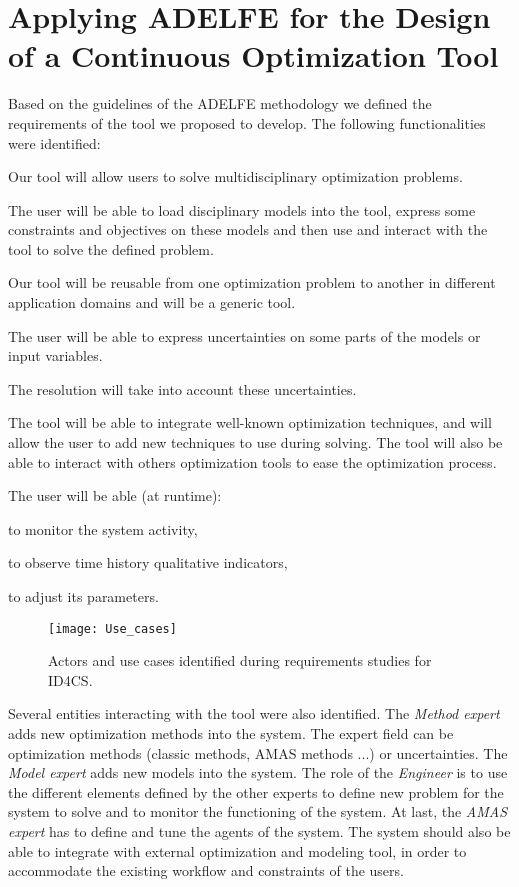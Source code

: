 \section{Applying ADELFE for the Design of a Continuous Optimization Tool}

Based on the guidelines of the ADELFE methodology we defined the requirements of the tool we proposed to develop. The following functionalities were identified:
\begin{compactitem}
\item Our tool will allow users to solve multidisciplinary optimization problems.
\item The user will be able to load disciplinary models into the tool, express some constraints and objectives on these models and then use and interact with the tool to solve the defined problem.
\item Our tool will be reusable from one optimization problem to another in different application domains and will be a generic tool.
\item The user will be able to express uncertainties on some parts of the models or input variables.
\item The resolution will take into account these uncertainties.
\item The tool will be able to integrate well-known optimization techniques, and will allow the user to add new techniques to use during solving. The tool will also be able to interact with others optimization tools to ease the optimization process.

\item The user will be able (at runtime):
	\begin{compactitem}
	\item to monitor the system activity,
	\item to observe time history qualitative indicators,
	\item to adjust its parameters.
	\end{compactitem}
\end{compactitem}

\begin{figure}
\centering
\texttt{[image: Use\_cases]}
\caption{Actors and use cases identified during requirements studies for ID4CS.}\label{Use_cases}
\end{figure}

Several entities interacting with the tool were also identified. The \emph{Method expert} adds new optimization methods into the system. The expert field can be optimization methods (classic methods, AMAS methods ...) or uncertainties. The \emph{Model expert} adds new models into the system. The role of the \emph{Engineer} is to use the different elements defined by the other experts to define new problem for the system to solve and to monitor the functioning of the system. At last, the \emph{AMAS expert} has to define and tune the agents of the system. The system should also be able to integrate with external optimization and modeling tool, in order to accommodate the existing workflow and constraints of the users.

